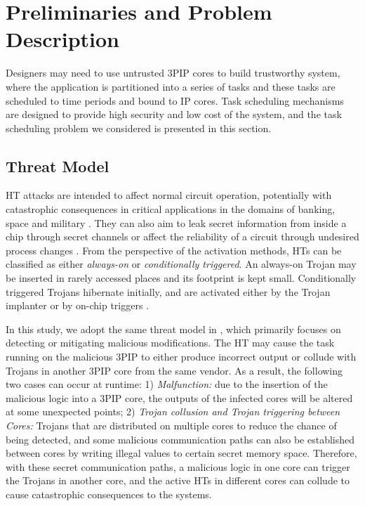 \documentclass[10pt,journal, compsoc]{IEEEtran}
\begin{document}
\section{Preliminaries and Problem Description}


Designers may need to use untrusted 3PIP cores to build trustworthy system, where the application is partitioned into a series of tasks and these tasks are scheduled to time periods and bound to IP cores. Task scheduling mechanisms are designed to provide high security and low cost of the system, and the task scheduling problem we considered is presented in this section.

\subsection{Threat Model}



HT attacks are intended to affect normal circuit operation, potentially with catastrophic consequences in critical applications in the domains of banking, space and military \cite{article:SB1}. They can also aim to leak secret information from inside a chip through secret channels or affect the reliability of a circuit through undesired process changes \cite{article:RC}. From the perspective of the activation methods, HTs can be classified as either \textit{always-on} or \textit{conditionally triggered}. An always-on Trojan may be inserted in rarely accessed places and its footprint is kept small. Conditionally triggered Trojans hibernate initially, and are activated either by the Trojan implanter or by on-chip triggers \cite{article:CL}.

In this study, we adopt the same threat model in \cite{article:CL, article:YS}, which primarily focuses on detecting or mitigating malicious modifications. The HT may cause the task running on the malicious 3PIP to either produce incorrect output or collude with Trojans in another 3PIP core from the same vendor. As a result, the following two cases can occur at runtime: 1) \textit{Malfunction:} due to the insertion of the malicious logic into a 3PIP core, the outputs of the infected cores will be altered at some unexpected points; 2) \textit{Trojan collusion and Trojan triggering between Cores:} Trojans that are distributed on multiple cores to reduce the chance of being detected, and some malicious communication paths can also be established between cores by writing illegal values to certain secret memory space. Therefore, with these secret communication paths, a malicious logic in one core can trigger the Trojans in another core, and the active HTs in different cores can collude to cause catastrophic consequences to the systems.%
\end{document}

